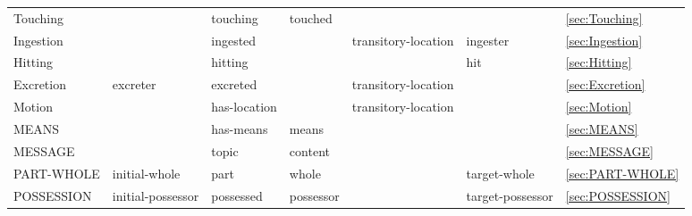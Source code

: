 \documentclass[a4paper]{article}
\newcommand{\fr}[1]{\textsf{#1}}
\newcommand{\rl}[1]{\textsf{#1}}
\begin{document}
\begin{table}
{\begin{tabular}{lllllll}
            \fr{Touching} & & \rl{touching} & \rl{touched} & & & \ref{sec:Touching} \\
            \fr{Ingestion} & & \rl{ingested} & & \rl{transitory-location} & \rl{ingester} & \ref{sec:Ingestion} \\
            \fr{Hitting} & & \rl{hitting} & & & \rl{hit} & \ref{sec:Hitting} \\
            \fr{Excretion} & \rl{excreter} & \rl{excreted} & & \rl{transitory-location} & & \ref{sec:Excretion} \\
            \fr{Motion} & & \rl{has-location} & & \rl{transitory-location} & & \ref{sec:Motion} \\
            \fr{MEANS} & & \rl{has-means} & \rl{means} & & & \ref{sec:MEANS} \\
            \fr{MESSAGE} & & \rl{topic} & \rl{content} & & & \ref{sec:MESSAGE} \\
            \fr{PART-WHOLE} & initial-whole & \rl{part} & \rl{whole} & & target-whole & \ref{sec:PART-WHOLE} \\
            \fr{POSSESSION} & initial-possessor & \rl{possessed} & \rl{possessor} & & target-possessor & \ref{sec:POSSESSION} \\

\end{tabular}}
\end{table}
\end{document}

